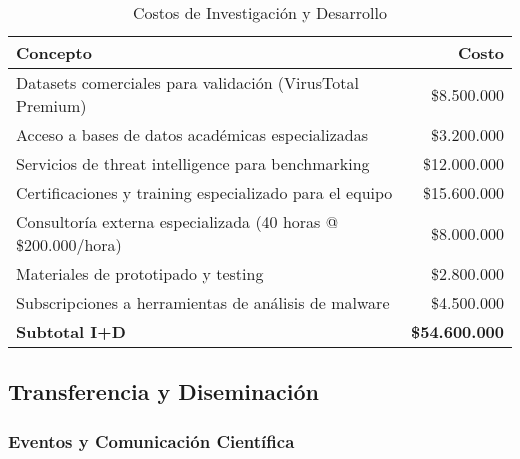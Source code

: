 \begin{table}[H]
    \centering
    \caption{Costos de Investigación y Desarrollo}
    \label{tab:investigacion}
    \small
    \begin{tabular}{|l|r|}
        \hline
        \textbf{Concepto} & \textbf{Costo} \\
        \hline
        Datasets comerciales para validación (VirusTotal Premium) & \$8.500.000 \\
        \hline
        Acceso a bases de datos académicas especializadas & \$3.200.000 \\
        \hline
        Servicios de threat intelligence para benchmarking & \$12.000.000 \\
        \hline
        Certificaciones y training especializado para el equipo & \$15.600.000 \\
        \hline
        Consultoría externa especializada (40 horas @ \$200.000/hora) & \$8.000.000 \\
        \hline
        Materiales de prototipado y testing & \$2.800.000 \\
        \hline
        Subscripciones a herramientas de análisis de malware & \$4.500.000 \\
        \hline
        \textbf{Subtotal I+D} & \textbf{\$54.600.000} \\
        \hline
    \end{tabular}
\end{table}

\subsection{Transferencia y Diseminación}

\subsubsection{Eventos y Comunicación Científica}

